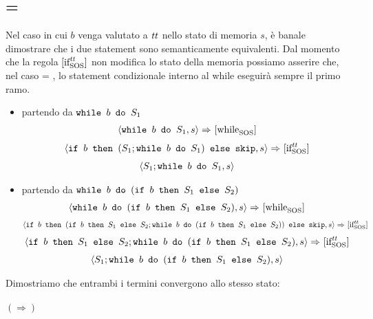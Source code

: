 \subsection{ = \semtrue}

Nel caso in cui $b$ venga valutato a $\semtrue$ nello stato di memoria $s$, è
banale dimostrare che i due statement sono semanticamente equivalenti. Dal 
momento che la regola $\ifttSOS{}$ non modifica lo stato della memoria
possiamo asserire che, nel caso  = \semtrue, lo 
statement condizionale interno al while eseguirà sempre il primo ramo.

\begin{itemize}
  \item partendo da $\wbS{b}{S_1}$
\begin{align*}
\confSs{\wbS{b}{S_1}}{s} \Rar{}
\whileSOS
\end{align*}
\begin{align*}
\confSs{\ifABC{b}{(S_1;\wbS{b}{S_1})}{\skipForFriends}}{s} \Rar{}
\ifttSOS
\end{align*}
\begin{align*}
\confSs{S_1;\wbS{b}{S_1}}{s}
\end{align*}
  \item partendo da $\wbS{b}{(\ifABC{b}{S_1}{S_2})}$
\begin{align*}
\confSs{\wbS{b}{(\ifABC{b}{S_1}{S_2})}}{s} \Rar{}
\whileSOS
\end{align*}
\begin{align*}
\confSs{\ifABC{b}
              {(\ifABC{b}{S_1}{S_2}; \wbS{b}{(\ifABC{b}{S_1}{S_2})})}
              {\skipForFriends}}
       {s} \Rar{}
\ifttSOS
\end{align*}
\begin{align*}
\confSs{\ifABC{b}{S_1}{S_2}; \wbS{b}{(\ifABC{b}{S_1}{S_2})}}
       {s} \Rar{}
\ifttSOS
\end{align*}
\begin{align*}
\confSs{S_1; \wbS{b}{(\ifABC{b}{S_1}{S_2})}}{s}
\end{align*}
\end{itemize}

Dimostriamo che entrambi i termini convergono allo stesso
stato:

\paragraph{$(\Rightarrow)$}

